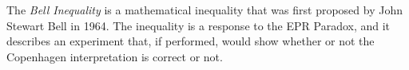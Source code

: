 \begin{definition}
    The \emph{Bell Inequality} is a mathematical inequality that was first proposed by John Stewart Bell in 1964. The inequality is a response to the EPR Paradox, and it describes an experiment that, if performed, would show whether or not the Copenhagen interpretation is correct or not.
    


\end{definition}
